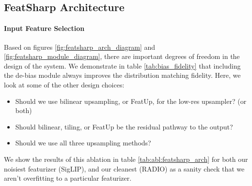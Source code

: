 \subsection{FeatSharp Architecture}\label{sec:featsharp_arch_ablations}

\paragraph{Input Feature Selection}\label{sec:featsharp_arch:inputs}
Based on figures \ref{fig:featsharp_arch_diagram} and \ref{fig:featsharp_module_diagram}, there are important degrees of freedom in the design of the system. We demonstrate in table \ref{tab:bias_fidelity} that including the de-bias module always improves the distribution matching fidelity. Here, we look at some of the other design choices:

\begin{itemize}
    \item Should we use bilinear upsampling, or FeatUp, for the low-res upsampler? (or both)
    \item Should bilinear, tiling, or FeatUp be the residual pathway to the output?
    \item Should we use all three upsampling methods?
\end{itemize}

We show the results of this ablation in table \ref{tab:abl:featsharp_arch} for both our noisiest featurizer (SigLIP), and our cleanest (RADIO) as a sanity check that we aren't overfitting to a particular featurizer.

